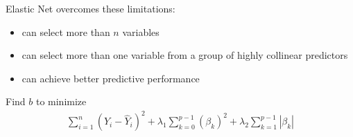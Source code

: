 \documentclass[12pt]{../notes}
\begin{document}
\nspace

Elastic Net overcomes these limitations: %
\begin{itemize}
  \item can select more than $n$ variables
  \item can select more than one variable from a group of highly collinear predictors
  \item can achieve better predictive performance %
\end{itemize}

\nspace

Find $b$ to minimize
  \begin{eqnarray}
    \sum_{i=1}^{n} \left( Y_i - \hat{Y}_i \right)^2 + \lambda_1 \sum_{k=0}^{p-1} \left(\beta_k \right)^2 + \lambda_2 \sum_{k=1}^{p-1} |\beta_k| \nonumber
  \end{eqnarray}
 

\end{document}
